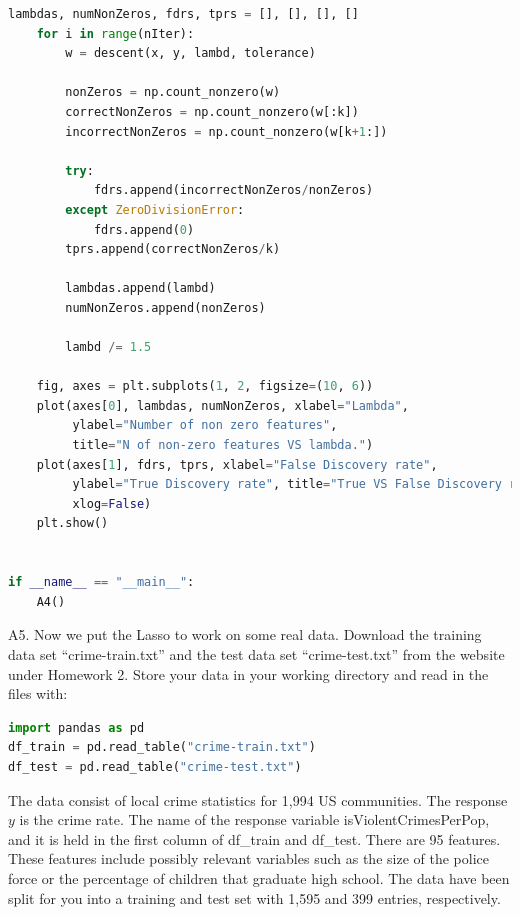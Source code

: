 \documentclass{article}
\newcommand{\1}{\mathbf{1}}
\begin{document}
\begin{enumerate}
\begin{lstlisting}[language=Python]
    lambdas, numNonZeros, fdrs, tprs = [], [], [], []
    for i in range(nIter):
        w = descent(x, y, lambd, tolerance)

        nonZeros = np.count_nonzero(w)
        correctNonZeros = np.count_nonzero(w[:k])
        incorrectNonZeros = np.count_nonzero(w[k+1:])

        try:
            fdrs.append(incorrectNonZeros/nonZeros)
        except ZeroDivisionError:
            fdrs.append(0)
        tprs.append(correctNonZeros/k)

        lambdas.append(lambd)
        numNonZeros.append(nonZeros)

        lambd /= 1.5

    fig, axes = plt.subplots(1, 2, figsize=(10, 6))
    plot(axes[0], lambdas, numNonZeros, xlabel="Lambda",
         ylabel="Number of non zero features",
         title="N of non-zero features VS lambda.")
    plot(axes[1], fdrs, tprs, xlabel="False Discovery rate",
         ylabel="True Discovery rate", title="True VS False Discovery rates.",
         xlog=False)
    plt.show()


if __name__ == "__main__":
    A4()
\end{lstlisting}
\end{enumerate}




\newpage
A5. Now we put the Lasso to work on some real data.  Download the training data set “crime-train.txt” and the test data set “crime-test.txt” from the website under Homework 2.  Store your data in your working directory and read in the files with:
\begin{lstlisting}[language=Python]
import pandas as pd
df_train = pd.read_table("crime-train.txt")
df_test = pd.read_table("crime-test.txt")
\end{lstlisting}

The data consist of local crime statistics for 1,994 US communities. The response $y$ is the crime rate. The name of the response variable isViolentCrimesPerPop, and it is held in the first column of df\_train and df\_test. There are 95 features. These features include possibly relevant variables such as the size of the police force or the percentage of children that graduate high school. The data have been split for you into a training and test set with 1,595 and 399 entries, respectively.
\end{document}
